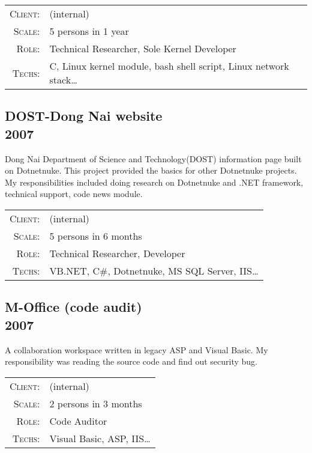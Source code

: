 \documentclass[a4paper,10pt]{article}
\begin{document}
\begin{tabular}{rl}
    \textsc{Client:} & \small(internal) \\
    \textsc{Scale:} & 5 persons in 1 year\\
    \textsc{Role:} & Technical Researcher, Sole Kernel Developer\\
    \textsc{Techs:} & C, Linux kernel module, bash shell script, Linux network stack\ldots\\
\end{tabular}

\subsection*{DOST-Dong Nai website\\\small 2007}

Dong Nai Department of Science and Technology(DOST) information page built on Dotnetnuke.
This project provided the basics for other Dotnetnuke projects.
My responsibilities included doing research on Dotnetnuke and .NET framework, technical support, code news module.

\begin{tabular}{rl}
    \textsc{Client:} & \small(internal) \\
    \textsc{Scale:} & 5 persons in 6 months\\
    \textsc{Role:} & Technical Researcher, Developer\\
    \textsc{Techs:} & VB.NET, C\#, Dotnetnuke, MS SQL Server, IIS\ldots\\
\end{tabular}

\subsection*{M-Office (code audit)\\\small 2007}

A collaboration workspace written in legacy ASP and Visual Basic.
My responsibility was reading the source code and find out security bug.

\begin{tabular}{rl}
    \textsc{Client:} & \small(internal) \\
    \textsc{Scale:} & 2 persons in 3 months\\
    \textsc{Role:} & Code Auditor\\
    \textsc{Techs:} & Visual Basic, ASP, IIS\ldots\\
\end{tabular}
\end{document}
